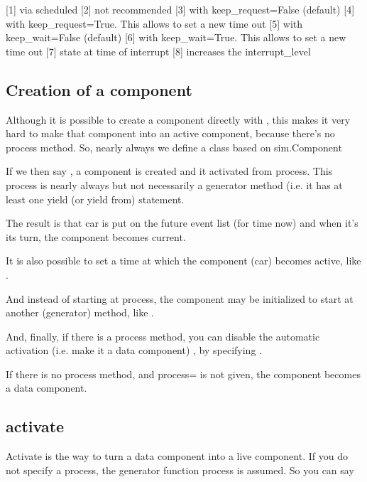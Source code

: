 \documentclass[letterpaper,10pt,english]{sphinxmanual}
\begin{document}
{[}1{]} via scheduled 
{[}2{]} not recommended 
{[}3{]} with keep\_request=False (default) 
{[}4{]} with keep\_request=True. This allows to set a new time out 
{[}5{]} with keep\_wait=False (default) 
{[}6{]} with keep\_wait=True. This allows to set a new time out 
{[}7{]} state at time of interrupt 
{[}8{]} increases the interrupt\_level 


\subsection{Creation of a component}
\label{\detokenize{Component:creation-of-a-component}}
Although it is possible to create a component directly with , this
makes it very hard to make that component into an active component,
because there’s no process method. So, nearly always we define a class based on
sim.Component

\begin{sphinxVerbatim}[commandchars=\\\{\}]
 
     
\end{sphinxVerbatim}

If we then say , a component is created and it activated from process. This
process is nearly always but not necessarily a generator method (i.e. it has at least one yield (or yield from) statement.

The result is that car is put on the future event list (for time now) and when it’s its
turn, the component becomes current.

It is also possible to set a time at which the component (car) becomes active, like .

And instead of starting at process, the component may be initialized to start at another (generator) method,
like .

And, finally, if there is a process method, you can disable the automatic activation (i.e.
make it a data component) , by specifying .

If there is no process method, and process= is not given, the component becomes a data component.


\subsection{activate}
\label{\detokenize{Component:activate}}
Activate is the way to turn a data component into a live component. If you do not specify a process,
the generator function process is assumed. So you can say
\end{document}
